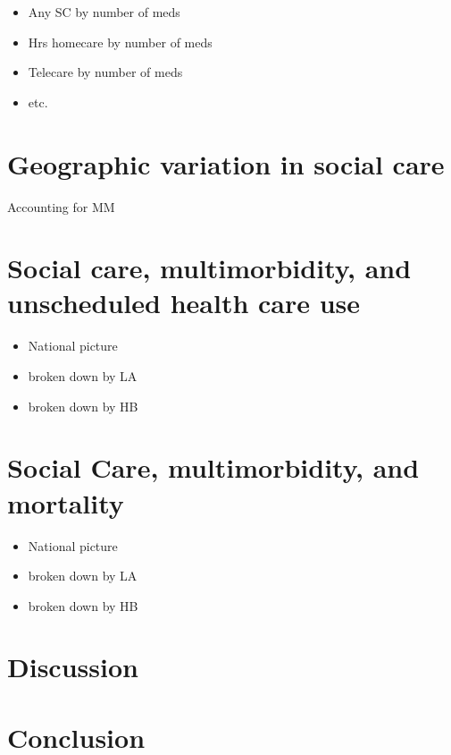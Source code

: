 \documentclass[12pt,]{report}
\begin{document}
\begin{itemize}[noitemsep]
\item Any SC by number of meds
\item Hrs homecare by number of meds
\item Telecare by number of meds
\item etc.
\end{itemize}

\section{Geographic variation in social care}

Accounting for MM

\section{Social care, multimorbidity, and unscheduled health care use}

\begin{itemize}[noitemsep]
\item National picture
\item broken down by LA
\item broken down by HB
\end{itemize}

\section{Social Care, multimorbidity, and mortality}

\begin{itemize}[noitemsep]
\item National picture
\item broken down by LA
\item broken down by HB
\end{itemize}

\section{Discussion}\label{sec:social-care-discuss}

\section{Conclusion}\label{sec:social-care-conclu}

\FloatBarrier

\FloatBarrier
\newpage
{}
\end{document}
